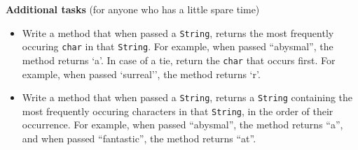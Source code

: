 \vskip 1cm

\textbf{Additional tasks} (for anyone who has a little spare time)

\begin{itemize}
\item Write a method that when passed a \texttt{String}, returns the most frequently occuring \texttt{char} in that \texttt{String}. For example, when passed ``abysmal'', the method returns `a'. In case of a tie, return the \texttt{char} that occurs first. For example, when passed `surreal'', the method returns `r'.

\item Write a method that when passed a \texttt{String}, returns a \texttt{String} containing the most frequently occuring characters in that \texttt{String}, in the order of their occurrence. For example, when passed ``abysmal'', the method returns ``a'', and when passed ``fantastic'', the method returns ``at''.

\end{itemize}



